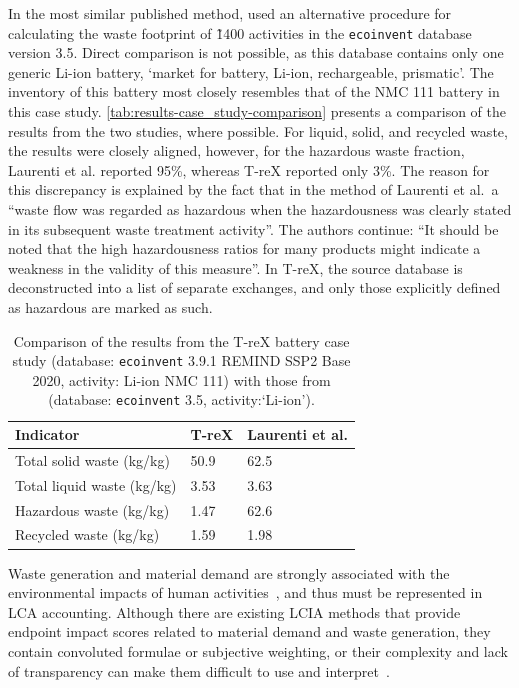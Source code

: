 \documentclass[a4paper,fleqn,longmktitle]{cas-dc}
\begin{document}
In the most similar published method, \cite{laurenti2023wastefootprint} used an alternative procedure for calculating the waste footprint of \~1400 activities in the \texttt{ecoinvent} database version 3.5. Direct comparison is not possible, as this database contains only one generic Li-ion battery, `market for battery, Li-ion, rechargeable, prismatic'. The inventory of this battery most closely resembles that of the NMC 111 battery in this case study. \autoref{tab:results-case_study-comparison} presents a comparison of the results from the two studies, where possible. For liquid, solid, and recycled waste, the results were closely aligned, however, for the hazardous waste fraction, Laurenti et al. reported 95\%, whereas T-reX reported only 3\%. The reason for this discrepancy is explained by the fact that in the method of Laurenti et al.\, a ``waste flow was regarded as hazardous when the hazardousness was clearly stated in its subsequent waste treatment activity''. The authors continue: ``It should be noted that the high hazardousness ratios for many products might indicate a weakness in the validity of this measure''. In T-reX, the source database is deconstructed into a list of separate exchanges, and only those explicitly defined as hazardous are marked as such.

\begin{table}[H]
    \centering
    \caption{Comparison of the results from the T-reX battery case study (database: \texttt{ecoinvent} 3.9.1 REMIND SSP2 Base 2020, activity: Li-ion NMC 111) with those from \cite{laurenti2023wastefootprint} (database: \texttt{ecoinvent} 3.5, activity:`Li-ion').}\label{tab:results-case_study-comparison}
    \begin{tabular}{lll}
        \toprule
        \textbf{Indicator}         & \textbf{T-reX} & \textbf{Laurenti et al.} \\
        \midrule
        Total solid waste (kg/kg)  & 50.9           & 62.5                     \\
        Total liquid waste (kg/kg) & 3.53           & 3.63                     \\
        Hazardous waste (kg/kg)    & 1.47           & 62.6                     \\
        Recycled waste (kg/kg)     & 1.59           & 1.98                     \\
        \bottomrule
    \end{tabular}
\end{table}


Waste generation and material demand are strongly associated with the environmental impacts of human activities~\citep{laurenti2023wastefootprint,steinmann2017resourcefootprints, demirer2019wastefootprint}, and thus must be represented in LCA accounting. Although there are existing LCIA methods that provide endpoint impact scores related to material demand and waste generation, they contain convoluted formulae or subjective weighting, or their complexity and lack of transparency can make them difficult to use and interpret~\citep{foen2021ecofactors,hauschild2003edip,cen2019en15804, arvidsson2020csi,foen2021ecofactors}.
\end{document}
